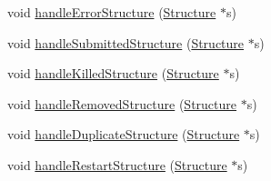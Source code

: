 \begin{DoxyCompactItemize}
\item 
void \hyperlink{classGlobalSearch_1_1QueueManager_a11c594794b1b96ad8524a88866acac3f}{handle\-Error\-Structure} (\hyperlink{classGlobalSearch_1_1Structure}{Structure} $\ast$s)
\item 
void \hyperlink{classGlobalSearch_1_1QueueManager_a01c36b34d2fc7ca0bf03a929a4da9e4d}{handle\-Submitted\-Structure} (\hyperlink{classGlobalSearch_1_1Structure}{Structure} $\ast$s)
\item 
void \hyperlink{classGlobalSearch_1_1QueueManager_a80e344243b5a701da60d8b7917013fd1}{handle\-Killed\-Structure} (\hyperlink{classGlobalSearch_1_1Structure}{Structure} $\ast$s)
\item 
void \hyperlink{classGlobalSearch_1_1QueueManager_ab715f5753ac932c47facb214573f8b8b}{handle\-Removed\-Structure} (\hyperlink{classGlobalSearch_1_1Structure}{Structure} $\ast$s)
\item 
void \hyperlink{classGlobalSearch_1_1QueueManager_a84149fe85ad675e47950a69d32ad7c6a}{handle\-Duplicate\-Structure} (\hyperlink{classGlobalSearch_1_1Structure}{Structure} $\ast$s)
\item 
void \hyperlink{classGlobalSearch_1_1QueueManager_a81c488f9671a05b9d51eff9c2fc514d6}{handle\-Restart\-Structure} (\hyperlink{classGlobalSearch_1_1Structure}{Structure} $\ast$s)
\end{DoxyCompactItemize}

